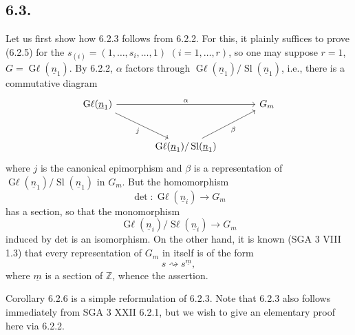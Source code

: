%

\subsection*{6.3.}
Let us first show how 6.2.3 follows from 6.2.2. For this, it plainly suffices to prove (6.2.5) for the
\(s_{(i)}=(1,\ldots,s_i,\ldots,1)\) \((i=1,\ldots,r)\), so one may suppose \(r=1\), \(G=\operatorname{G\ell}(\underline{n}_1)\). By 6.2.2, \(\alpha\) factors through \(\operatorname{G\ell}(\underline{n}_1)/\operatorname{Sl}(\underline{n}_1)\), i.e., there is a commutative diagram
\[
\begin{tikzcd}[column sep=large,row sep=large]
\operatorname{G\ell}(\underline{n}_1) \arrow[rr,"\alpha"] \arrow[dr,"j"'] && {G}_m\\
& \operatorname{G\ell}(\underline{n}_1)/\operatorname{Sl}(\underline{n}_1) \arrow[ur,"\beta"'] &
\end{tikzcd}
\]
where \(j\) is the canonical epimorphism and \(\beta\) is a representation of \(\operatorname{G\ell}(\underline{n}_1)/\operatorname{Sl}(\underline{n}_1)\) in \({G}_m\). But the homomorphism
\[
 \det:\operatorname{G\ell}(\underline{n}_i)\longrightarrow{G}_m
\]
has a section, so that the monomorphism
\[
 \operatorname{G\ell}(\underline{n}_i)/\operatorname{S\ell}(\underline{n}_i)\longrightarrow{G}_m
\]
induced by det is an isomorphism. On the other hand, it is known (SGA 3 VIII 1.3) that every representation of \({G}_m\) in itself is of the form
\[
 s\rightsquigarrow s^{\underline{m}},
\]
where \(\underline{m}\) is a section of \(\mathbb Z\), whence the assertion.

Corollary 6.2.6 is a simple reformulation of 6.2.3. Note that 6.2.3 also follows immediately from SGA 3 XXII 6.2.1, but we wish to give an elementary proof here via 6.2.2.

%

